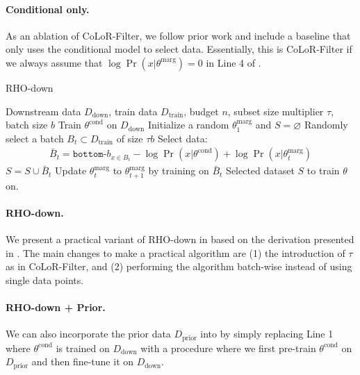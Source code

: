 \documentclass{article}
\newcommand{\Dprior}{D_{\text{prior}}}
\newcommand{\Ddown}{D_{\text{down}}}
\newcommand{\Dtrain}{D_{\text{train}}}
\newcommand{\thetacond}{\theta^{\text{cond}}}
\newcommand{\thetamarg}{\theta^{\text{marg}}}
\begin{document}
\paragraph{Conditional only.} As an ablation of CoLoR-Filter, we follow prior work \citep{evans2023bad} and include a baseline that only uses the conditional model to select data. Essentially, this is CoLoR-Filter if we always assume that $ \log \Pr(x|\thetamarg) = 0$ in Line 4 of . 

\begin{algorithm}[h]
\caption{RHO-down}
\begin{algorithmic}[1]
\label{alg:rho}
  \REQUIRE Downstream data $ \Ddown$, train data $ \Dtrain$, budget $ n$, subset size multiplier $ \tau$, batch size $ b$
  \STATE Train $ \thetacond$ on $ \Ddown$
  \STATE Initialize a random $ \thetamarg_1$ and $ S = \varnothing$
  \STATE Randomly select a batch $ B_t \subset \Dtrain$ of size $ \tau b$
  \STATE Select data:
    \vspace{-0.4cm}
  \begin{align*}
        \bar B_t = \texttt{bottom-}b_{x \in B_t} - \log \Pr(x| \thetacond) + \log \Pr(x| \thetamarg_t)
    \end{align*}
    \vspace{-0.5cm}
    \STATE $S = S \cup \bar B_t$
    \STATE Update $ \thetamarg_t $ to $ \thetamarg_{t+1}$ by training on $ \bar B_t$
    \ENDFOR
  \RETURN Selected dataset $S$ to train $ \theta$ on.
\end{algorithmic}
\end{algorithm}

\paragraph{RHO-down.} We present a practical variant of RHO-down in  based on the derivation presented in . The main changes to make a practical algorithm are (1) the introduction of $ \tau$ as in CoLoR-Filter, and (2) performing the algorithm batch-wise instead of using single data points.

\paragraph{RHO-down + Prior.} We can also incorporate the prior data $ \Dprior$ into  by simply replacing Line 1 where $ \thetacond$ is trained on $ \Ddown$ with a procedure where we first pre-train $ \thetacond$ on $ \Dprior$ and then fine-tune it on $ \Ddown$. 
\end{document}
